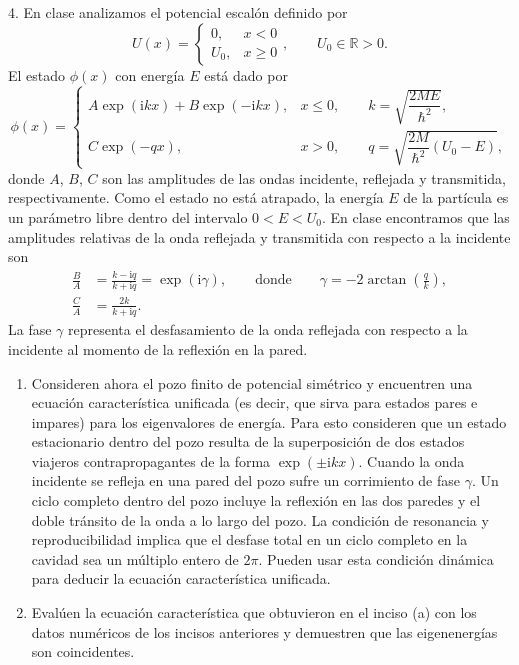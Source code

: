\begin{pregunta}{4.}
En clase analizamos el potencial escalón definido por
\begin{equation}
U(x) = \begin{cases} 0, & x < 0 \\ U_0, & x \geq 0 \end{cases}, \qquad U_0 \in \mathbb{R} > 0. \tag{6}
\end{equation}
El estado $\phi(x)$ con energía $E$ está dado por
\begin{equation}
\phi(x) = \begin{cases} A \exp(\mathrm{i}kx) + B \exp(-\mathrm{i}kx), & x \leq 0, \qquad k = \sqrt{\dfrac{2ME}{\hbar^2}}, \\[2ex] C \exp(-qx), & x > 0, \qquad q = \sqrt{\dfrac{2M}{\hbar^2}(U_0 - E)}, \end{cases} \tag{7}
\end{equation}
donde $A$, $B$, $C$ son las amplitudes de las ondas incidente, reflejada y transmitida, respectivamente. Como el estado no está atrapado, la energía $E$ de la partícula es un parámetro libre dentro del intervalo $0 < E < U_0$. En clase encontramos que las amplitudes relativas de la onda reflejada y transmitida con respecto a la incidente son
\begin{align}
\frac{B}{A} &= \frac{k - \mathrm{i}q}{k + \mathrm{i}q} = \exp(\mathrm{i}\gamma), \qquad \text{donde} \qquad \gamma = -2\arctan\left( \frac{q}{k} \right), \tag{8} \\
\frac{C}{A} &= \frac{2k}{k + \mathrm{i}q}. \tag{9}
\end{align}
La fase $\gamma$ representa el desfasamiento de la onda reflejada con respecto a la incidente al momento de la reflexión en la pared.
 
\begin{enumerate}
\item[a)] Consideren ahora el pozo finito de potencial simétrico y encuentren una ecuación característica unificada (es decir, que sirva para estados pares e impares) para los eigenvalores de energía. Para esto consideren que un estado estacionario dentro del pozo resulta de la superposición de dos estados viajeros contrapropagantes de la forma $\exp(\pm \mathrm{i}kx)$. Cuando la onda incidente se refleja en una pared del pozo sufre un corrimiento de fase $\gamma$. Un ciclo completo dentro del pozo incluye la reflexión en las dos paredes y el doble tránsito de la onda a lo largo del pozo. La condición de resonancia y reproducibilidad implica que el desfase total en un ciclo completo en la cavidad sea un múltiplo entero de $2\pi$. Pueden usar esta condición dinámica para deducir la ecuación característica unificada.
 
\item[b)] Evalúen la ecuación característica que obtuvieron en el inciso (a) con los datos numéricos de los incisos anteriores y demuestren que las eigenenergías son coincidentes.
\end{enumerate}
\end{pregunta}

